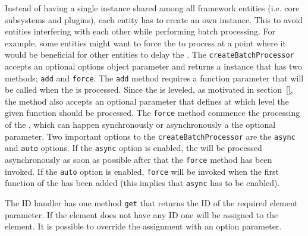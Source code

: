 \documentclass[a4paper,11pt]{kth-mag}
\newcommand{\code}[1]{\texttt{#1}}
\newcommand\abbr[2][]{\uppercase{#2}\ifthenelse{\equal{#1}{}}%
                     {}{#1}}
\begin{document}
          Instead of having a single  instance shared among all framework entities (i.e. core subsystems and plugins), each entity has to create an own instance.
          This to avoid entities interfering with each other while performing \gls{batch processing}.
          For example, some entities might want to force the  to process at a point where it would be beneficial for other entities to delay the .
          The \code{createBatchProcessor} accepts an optional options object parameter and returns a  instance that has two methods; \code{add} and \code{force}.
          The \code{add} method requires a function parameter that will be called when the  is processed.
          Since the  is leveled, as motivated in section~\ref{}, the method also accepts an optional parameter that defines at which level the given function should be processed.
          The \code{force} method commence the processing of the , which can happen synchronously or asynchronously a the optional parameter.
          Two important options to the \code{createBatchProcessor} are the \code{async} and \code{auto} options.
          If the \code{async} option is enabled, the  will be processed asynchronously as soon as possible after that the \code{force} method has been invoked.
          If the \code{auto} option is enabled, \code{force} will be invoked when the first function of the  has been added (this implies that \code{async} has to be enabled).

          The \abbr{ID} handler has one method \code{get} that returns the \abbr{ID} of the required element parameter.
          If the element does not have any \abbr{ID} one will be assigned to the element.
          It is possible to override the assignment with an option parameter.


\end{document}
